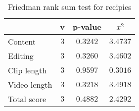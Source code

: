 \begin{table}[ht]
	\begin{center}
	\caption{Friedman rank sum test for recipies}
	\label{tab:fried_recip}
		\begin{tabular}{lccc}
		\toprule
			 & v & p-value & $x^2$\\
			\midrule
			Content & $3$ & $0.3242$ & $3.4737$\\
			Editing & $3$ & $0.3260$ & $3.4602$\\
			Clip length & $3$ & $0.9597$ & $0.3016$\\
			Video length & $3$ & $0.3218$ & $3.4918$\\
			Total score & $3$ & $0.4882$ & $2.4292$\\
		\bottomrule
		\end{tabular}
	\end{center}
\end{table}